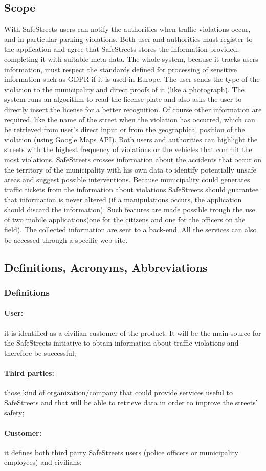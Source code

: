 \documentclass{article}
\begin{document}
\subsection{Scope}
With SafeStreets users can notify the authorities when traffic violations occur,
and in particular parking violations. Both user and authorities must register to
the application and agree that SafeStreets stores the information provided,
completing it with suitable meta-data. The whole system, because it tracks users
information, must respect the standards defined for processing of sensitive
information such as GDPR if it is used in Europe. The user sends the type of the
violation to the municipality and direct proofs of it (like a photograph). The
system runs an algorithm to read the license plate and also asks the user to
directly insert the license for a better recognition. Of course other
information are required, like the name of the street when the violation has
occurred, which can be retrieved from user's direct input or from the
geographical position of the violation (using Google Maps API). Both users and
authorities can highlight the streets with the highest frequency of violations
or the vehicles that commit the most violations. SafeStreets crosses information
about the accidents that occur on the territory of the municipality with his own
data to identify potentially unsafe areas and suggest possible interventions.
Because municipality could generates traffic tickets from the information about
violations SafeStreets should guarantee that information is never altered (if a
manipulations occurs, the application should discard the information). Such
features are made possible trough the use of two mobile applications(one for the
citizens and one for the officers on the field). The collected information are
sent to a back-end. All the services can also be accessed through a specific
web-site. 
\subsection{Definitions, Acronyms, Abbreviations}
\subsubsection{Definitions}
\paragraph{User:} it is identified as a civilian customer of the product. It
will be the main source for the SafeStreets initiative to obtain information
about traffic violations and therefore be successful; \paragraph{Third
parties:}those kind of organization/company that could provide services useful
to SafeStreets and that will be able to retrieve data in order to improve the
streets' safety; \paragraph{Customer:} it defines both third party SafeStreets
users (police officers or municipality employees) and civilians;
\end{document}

